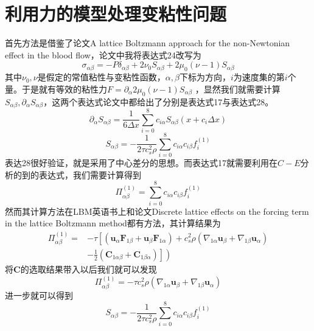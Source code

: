 \documentclass[11pt,UTF8]{ctexart}
\begin{document}
    \section{利用力的模型处理变粘性问题}
    \par{首先方法是借鉴了论文A lattice Boltzmann approach for the non-Newtonian effect in the blood flow，论文中我将表达式24改写为
    $$\sigma_{\alpha \beta}=-P \delta_{\alpha \beta}+2 \nu_{0} S_{\alpha \beta}+2 \mu_{0}\left(\nu-1\right) S_{\alpha \beta}$$
    其中$\nu_0,\nu$是假定的常值粘性与变粘性函数，$\alpha,\beta$下标为方向，$i$为速度集的第$i$个量。于是就有等效的粘性力$F=\partial_{\alpha}2 \mu_{0}\left(\nu-1\right) S_{\alpha \beta}$
    ，显然我们就需要计算$S_{\alpha \beta},\partial_{\alpha}S_{\alpha \beta}$，这两个表达式论文中都给出了分别是表达式17与表达式28。
    $$\partial_{\alpha} S_{\alpha \beta}=\frac{1}{6 \Delta x} \sum_{i=0}^{8} c_{i \alpha} S_{\alpha \beta}\left(x+c_{i} \Delta x\right)$$
    $$S_{\alpha \beta}=-\frac{1}{2 \tau c_{s}^{2}\rho} \sum_{i=0}^{8} c_{i \alpha} c_{i \beta} f_{i}^{(1)}$$
    表达28很好验证，就是采用了中心差分的思想。而表达式17就需要利用在$C-E$分析的到的表达式，我们需要计算得到
	$$\Pi_{\alpha \beta}^{(1)}=\sum_{i=0}^{8} c_{i \alpha} c_{i \beta} f_{i}^{(1)}$$
	然而其计算方法在LBM英语书上和论文Discrete lattice effects on the forcing term in the lattice Boltzmann method都有方法，其计算结果为
	$$\begin{aligned}
        \Pi_{\alpha \beta}^{(1)}=&-\tau\left[\left(\mathbf{u}_{\alpha} \mathbf{F}_{1 \beta}+\mathbf{u}_{\beta} \mathbf{F}_{1 \alpha}\right)+c_{s}^{2} \rho\left(\nabla_{1 \alpha} \mathbf{u}_{\beta}+\nabla_{1 \beta} \mathbf{u}_{\alpha}\right)\right.\\
        &\left.\left.-\frac{1}{2}\left(\mathbf{C}_{1 \alpha \beta}+\mathbf{C}_{1 \beta \alpha}\right)\right]\right)
        \end{aligned}$$
    将$\mathbf{C}$的选取结果带入以后我们就可以发现
    $$\Pi_{\alpha \beta}^{(1)}=-\tau c_s^2 \rho(\nabla_{1 \alpha} \mathbf{u}_{\beta}+\nabla_{1 \beta} \mathbf{u}_{\alpha})$$
    进一步就可以得到
    $$S_{\alpha \beta}=-\frac{1}{2 \tau c_{s}^{2}\rho} \sum_{i=0}^{8} c_{i \alpha} c_{i \beta} f_{i}^{(1)}$$}
\end{document}

